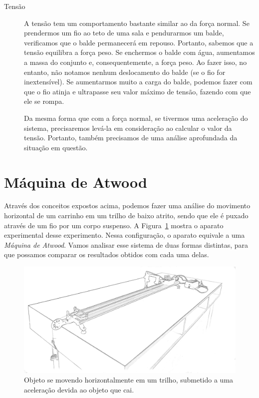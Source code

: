 \begin{description}
\item[Tensão] A tensão tem um comportamento bastante similar ao da força normal. Se prendermos um fio ao teto de uma sala e pendurarmos um balde, verificamos que o balde permanecerá em repouso. Portanto, sabemos que a tensão equilibra a força peso. Se enchermos o balde com água, aumentamos a massa do conjunto e, consequentemente, a força peso. Ao fazer isso, no entanto, não notamos nenhum deslocamento do balde (se o fio for inextensível). Se aumentarmos muito a carga do balde, podemos fazer com que o fio atinja e ultrapasse seu valor máximo de tensão, fazendo com que ele se rompa.

	Da mesma forma que com a força normal, se tivermos uma aceleração do sistema, precisaremos levá-la em consideração ao calcular o valor da tensão. Portanto, também precisamos de uma análise aprofundada da situação em questão.
\end{description}

\section{Máquina de Atwood}
\label{Sec:MaquinaDeAtwood}

Através dos conceitos expostos acima, podemos fazer uma análise do movimento horizontal de um carrinho em um trilho de baixo atrito, sendo que ele é puxado através de um fio por um corpo suspenso. A Figura~\ref{FigTrilho} mostra o aparato experimental desse experimento. Nessa configuração, o aparato equivale a uma \emph{Máquina de Atwood}. Vamos analisar esse sistema de duas formas distintas, para que possamos comparar os resultados obtidos com cada uma delas.

\begin{figure}
\centering
\includegraphics[width=\textwidth]{Ilustrations/MaquinaAtwoodCarrinho.png}
\caption{Objeto se movendo horizontalmente em um trilho, submetido a uma aceleração devida ao objeto que cai.\label{FigTrilho}}
\end{figure}


